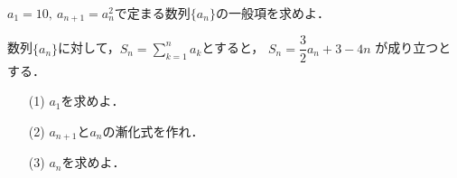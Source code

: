 \documentclass[a4paper,11pt]{ltjsarticle}
\title{}
\author{}
\date{}
\begin{document}
\begin{toi}
     $a_1=10,~a_{n+1}=a_n^2$で定まる数列$\{a_n\}$の一般項を求めよ．
\end{toi}
\begin{toi}
    数列$\{a_n\}$に対して，$S_n=\displaystyle{\sum_{k=1}^n a_k}$とすると，
    $S_n=\dfrac{3}{2}a_n+3-4n$
    が成り立つとする．
    \begin{itemize}
        \item [(1)]$a_1$を求めよ．
        \item [(2)]$a_{n+1}$と$a_n$の漸化式を作れ．
        \item [(3)]$a_n$を求めよ．
    \end{itemize}
\end{toi}
    
\end{document}
